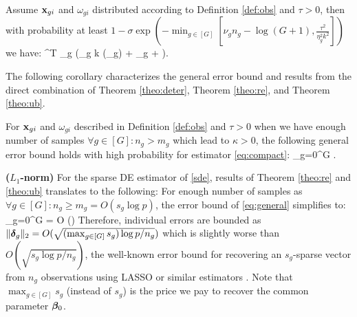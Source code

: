\begin{theorem}
	\label{theo:ub}
	Assume $\mathbf{x}_{gi}$ and $\omega_{gi}$ distributed according to Definition \ref{def:obs} and $\tau > 0$, then with probability at least  $1 - \sigma \exp\left(-\min_{g \in [G]}\left[\nu_g  n_g - \log (G+1), \frac{\tau^2}{\eta_g^2 k^2}\right]\right) $  we have:
	{\small
	\be
	\nr
	 \oomega ^T \X\ddelta
	\leq {} \max_{g \in [G]} \left(\zeta_g k \omega(\cA_g) + \epsilon_g + \tau \right). \nr
	\ee
	}
\end{theorem}

The following corollary characterizes the general error bound and results from the direct combination of Theorem \ref{theo:deter}, Theorem \ref{theo:re}, and Theorem \ref{theo:ub}.
\begin{corollary}
	\label{corr:calcub}
	For $\mathbf{x}_{gi}$ and $\omega_{gi}$ described in Definition \ref{def:obs} and $\tau > 0$ when we have enough number of samples $\forall g \in [G]: n_g > m_g$ which lead to $\kappa > 0$, the following general error bound holds with high probability for estimator \eqref{eq:compact}:
	{\small\be
	\label{eq:general}
	\sum_{g=0}^{G}  
	\leq {\gamma} .
	\ee	}
\end{corollary}
\begin{example}
	{\bf ($L_1$-norm)} For the sparse DE estimator of \eqref{sde}, results of Theorem \ref{theo:re} and \ref{theo:ub} translates to the following: For enough number of samples as $\forall g \in [G]: n_g \geq m_g = O(s_g \log p)$, the error bound of \eqref{eq:general} simplifies to:
	\be
	\sum_{g=0}^{G}  	= O \left(\right) %
	\ee 
	Therefore, individual errors are bounded as $\|\boldsymbol{\delta}_g\|_{2}	= O (\sqrt{(\max_{g \in [G]}  s_g)\log p/n_g})$
	which is slightly worse than $O(\sqrt{s_g\log p/n_g})$, the well-known error bound for recovering an $s_g$-sparse vector from $n_g$ observations using LASSO or similar estimators \cite{banerjee14, venkat12, candes2007dantzig, chatterjee2014generalized, bickel2009simultaneous}. Note that $\max_{g \in [G]}  s_g$ (instead of $s_g$) is the price we pay to recover the common parameter $\boldsymbol{\beta}_0$. 
\end{example}

